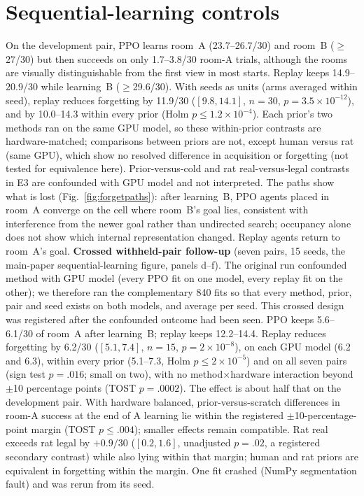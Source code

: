 \documentclass[10pt,onecolumn,letterpaper]{article}
\begin{document}
\section{Sequential-learning controls}
On the development pair, PPO learns room~A (23.7--26.7/30) and room~B ($\geq$27/30) but then succeeds on only
1.7--3.8/30 room-A trials, although the rooms are visually distinguishable from the first view in most starts.
Replay keeps 14.9--20.9/30 while learning~B ($\geq$29.6/30). With seeds as units (arms averaged within seed),
replay reduces forgetting by 11.9/30 ($[9.8,14.1]$, $n=30$, $p=3.5\times10^{-12}$), and by 10.0--14.3 within every
prior (Holm $p\leq1.2\times10^{-4}$). Each prior's two methods ran on the same GPU model, so these within-prior contrasts are hardware-matched;
comparisons between priors are not, except human versus rat (same GPU), which show no resolved difference in acquisition
or forgetting (not tested for equivalence here). Prior-versus-cold and rat real-versus-legal contrasts in E3 are confounded with GPU model and not
interpreted. The paths show what is lost (Fig.~\ref{fig:forgetpaths}): after
learning~B, PPO agents placed in room~A converge on the cell where room~B's goal lies, consistent with
interference from the newer goal rather than undirected search; occupancy alone does not show which internal
representation changed. Replay agents return to room~A's goal.
\textbf{Crossed withheld-pair follow-up} (seven pairs, 15 seeds, the main-paper sequential-learning figure, panels d--f). The original run
confounded method with GPU model (every PPO fit on one model, every replay fit on the other); we therefore ran the
complementary 840 fits so that every method, prior, pair and seed exists on both models, and average per seed. This
crossed design was registered after the confounded outcome had been seen. PPO keeps 5.6--6.1/30 of room~A after
learning~B; replay keeps 12.2--14.4. Replay reduces forgetting by 6.2/30 ($[5.1,7.4]$, $n=15$, $p=2\times10^{-8}$),
on each GPU model (6.2 and 6.3), within every prior (5.1--7.3, Holm $p\leq2\times10^{-5}$) and on all seven pairs
(sign test $p=.016$; small on two), with no method$\times$hardware interaction beyond $\pm$10 percentage points
(TOST $p=.0002$). The effect is about half that on the development pair. With hardware balanced, prior-versus-scratch differences in
room-A success at the end of A learning lie within the registered $\pm$10-percentage-point margin (TOST $p\leq.004$);
smaller effects remain compatible. Rat real exceeds rat legal by $+0.9/30$ ($[0.2,1.6]$, unadjusted $p=.02$, a
registered secondary contrast) while also lying within that margin; human and rat priors are equivalent in
forgetting within the margin. One fit crashed (NumPy segmentation fault) and was rerun from its seed.
\end{document}
